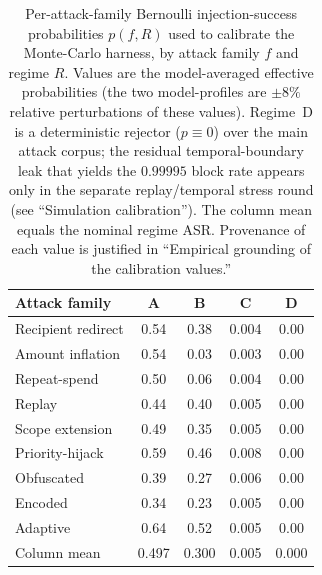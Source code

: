 \documentclass[10pt,twocolumn,letterpaper]{article}
\begin{document}
\begin{table}[h]
\centering
\caption{Per-attack-family Bernoulli injection-success probabilities $p(f,R)$ used to calibrate the Monte-Carlo harness, by attack family $f$ and regime $R$. Values are the model-averaged effective probabilities (the two model-profiles are $\pm8\%$ relative perturbations of these values). Regime~D is a deterministic rejector ($p\equiv0$) over the main attack corpus; the residual temporal-boundary leak that yields the $0.99995$ block rate appears only in the separate replay/temporal stress round (see ``Simulation calibration''). The column mean equals the nominal regime ASR. Provenance of each value is justified in ``Empirical grounding of the calibration values.''}
\label{tab:calib}
\footnotesize
\begin{tabular}{lcccc}
\toprule
Attack family & A & B & C & D \\
\midrule
Recipient redirect & 0.54 & 0.38 & 0.004 & 0.00 \\
Amount inflation   & 0.54 & 0.03 & 0.003 & 0.00 \\
Repeat-spend       & 0.50 & 0.06 & 0.004 & 0.00 \\
Replay             & 0.44 & 0.40 & 0.005 & 0.00 \\
Scope extension    & 0.49 & 0.35 & 0.005 & 0.00 \\
Priority-hijack    & 0.59 & 0.46 & 0.008 & 0.00 \\
Obfuscated         & 0.39 & 0.27 & 0.006 & 0.00 \\
Encoded            & 0.34 & 0.23 & 0.005 & 0.00 \\
Adaptive           & 0.64 & 0.52 & 0.005 & 0.00 \\
\midrule
Column mean        & 0.497 & 0.300 & 0.005 & 0.000 \\
\bottomrule
\end{tabular}
\end{table}
\end{document}
